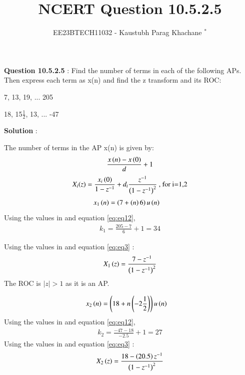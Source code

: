 \documentclass[journal,12pt,twocolumn]{IEEEtran}
\theoremstyle{remark}
\begin{document}

\vspace{3cm}

\Large\title{NCERT Question 10.5.2.5}
\large\author{EE23BTECH11032 - Kaustubh Parag Khachane $^{*}$%
}
\maketitle
\newpage
\bigskip

\renewcommand{\thefigure}{\theenumi}
\renewcommand{\thetable}{\theenumi}
\large\textbf{Question 10.5.2.5} : \normalsize Find the number of terms in each of the following APs. Then express each term as x(n) and find the z transform and its ROC: 

 7, 13, 19, ... 205

 18, 15$\frac{1}{2}$, 13, ... -47


\large\textbf{Solution} :\normalsize


The number of terms in the AP x(n) is given by: 
\begin{align}  \label{eq:eq12}
    \frac{x\left(n\right) - x\left(0\right)}{d} + 1
    \end{align}
\begin{align}
    X_i(z) = \frac{x_i\left(0\right)}{1 - z^{-1}} + d_i\frac{z^{-1}}{\left(1-z^{-1}\right)^2} \text{ , for i=1,2} \label{eq:eq3}
\end{align}
\textbf{}
\begin{align}
x_{1}\left(n\right) &= \left(7 + \left(n\right)6\right)u\left(n\right)
\end{align}
Using the values in  and equation \eqref{eq:eq12},
\begin{align}
    k_1 = \frac{205 - 7}{6} + 1 = 34
\end{align}

Using the values in  and equation \eqref{eq:eq3} :
\begin{align}
 X_1\left(z\right) = \frac{7 - z^{-1}}{\left(1-z^{-1}\right)^2}
 \end{align}
 The ROC is $|z|>1$ as it is an AP.
 
\textbf{}
\begin{align}
x_{2}\left(n\right) &= \left(18 + n\left(-2\frac{1}{2}\right)\right)u\left(n\right)
 \end{align}
 Using the values in  and equation \eqref{eq:eq12},
\begin{align}
    k_2 = \frac{-47 - 18}{-2.5} + 1 = 27
\end{align}
Using the values in  and equation \eqref{eq:eq3} :
\begin{align} 
 X_2\left(z\right) = \frac{18 - \left(20.5\right)z^{-1}}{\left(1 - z^{-1}\right)^2}
\end{align}
\end{document}
